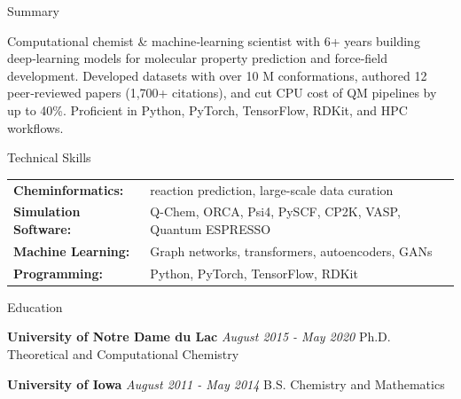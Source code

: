 \documentclass{resume} %
\begin{document}
\begin{rSection}{Summary}

Computational chemist \& machine‑learning scientist with 6+ years building deep‑learning models for molecular property prediction and force‑field development. Developed datasets with over 10 M conformations, authored 12 peer‑reviewed papers (1,700+ citations), and cut CPU cost of QM pipelines by up to 40\%. Proficient in Python, PyTorch, TensorFlow, RDKit, and HPC workflows.

\end{rSection}


\begin{rSection}{Technical Skills}

\begin{tabular}{ @{} l l @{} }
\textbf{Cheminformatics:} & reaction prediction, large-scale data curation \\
\textbf{Simulation Software:} & Q-Chem, ORCA, Psi4, PySCF, CP2K, VASP, Quantum ESPRESSO \\
\textbf{Machine Learning:} & Graph networks, transformers, autoencoders, GANs \\
\textbf{Programming:} & Python, PyTorch, TensorFlow, RDKit \\
\end{tabular}

\end{rSection}



\begin{rSection}{Education}

{\bf University of Notre Dame du Lac} \hfill {\em August 2015 - May 2020}
\newline Ph.D. Theoretical and Computational Chemistry

{\bf University of Iowa}   \hfill {\em August 2011 - May 2014} 
\newline B.S. Chemistry and Mathematics


\end{rSection}
\end{document}
